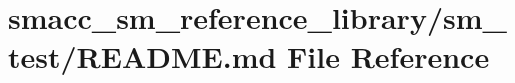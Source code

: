 \hypertarget{smacc__sm__reference__library_2sm__test_2README_8md}{}\section{smacc\+\_\+sm\+\_\+reference\+\_\+library/sm\+\_\+test/\+R\+E\+A\+D\+ME.md File Reference}
\label{smacc__sm__reference__library_2sm__test_2README_8md}
